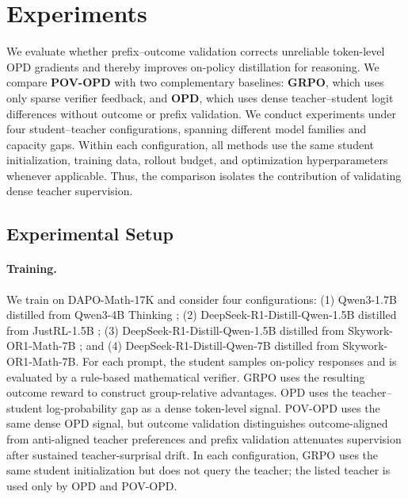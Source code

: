 \section{Experiments}


We evaluate whether prefix--outcome validation corrects unreliable token-level OPD gradients and thereby improves on-policy distillation for reasoning. We compare \textbf{POV-OPD} with two complementary baselines: \textbf{GRPO}, which uses only sparse verifier feedback, and \textbf{OPD}, which uses dense teacher--student logit differences without outcome or prefix validation. We conduct experiments under four student--teacher configurations, spanning different model families and capacity gaps. Within each configuration, all methods use the same student initialization, training data, rollout budget, and optimization hyperparameters whenever applicable. Thus, the comparison isolates the contribution of validating dense teacher supervision.



\subsection{Experimental Setup}

\paragraph{Training.}
We train on DAPO-Math-17K \cite{yu2025dapo} and consider four configurations: (1) Qwen3-1.7B distilled from Qwen3-4B Thinking \cite{yang2025qwen3}; (2) DeepSeek-R1-Distill-Qwen-1.5B \cite{guo2025deepseekr1} distilled from JustRL-1.5B \cite{he2025justrl}; (3) DeepSeek-R1-Distill-Qwen-1.5B distilled from Skywork-OR1-Math-7B \cite{he2025skyworkor1}; and (4) DeepSeek-R1-Distill-Qwen-7B distilled from Skywork-OR1-Math-7B. For each prompt, the student samples on-policy responses and is evaluated by a rule-based mathematical verifier. GRPO uses the resulting outcome reward to construct group-relative advantages. OPD uses the teacher--student log-probability gap as a dense token-level signal. POV-OPD uses the same dense OPD signal, but outcome validation distinguishes outcome-aligned from anti-aligned teacher preferences and prefix validation attenuates supervision after sustained teacher-surprisal drift. In each configuration, GRPO uses the same student initialization but does not query the teacher; the listed teacher is used only by OPD and POV-OPD.

